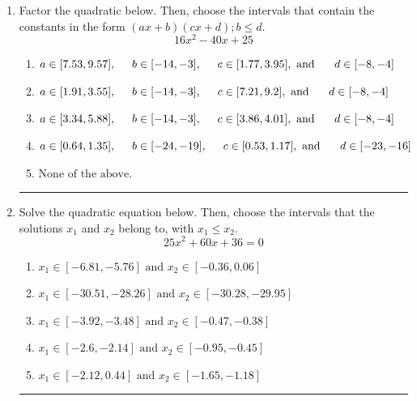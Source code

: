 \documentclass[14pt]{extbook}
\newcommand{\litem}[1]{\item#1\hspace*{-1cm}\rule{\textwidth}{0.4pt}}
\begin{document}
\begin{enumerate}
{\begin{enumerate}[label=\Alph*.]
\end{enumerate} }
\litem{
Factor the quadratic below. Then, choose the intervals that contain the constants in the form $(ax+b)(cx+d); b \leq d.$\[ 16x^{2} -40 x + 25 \]\begin{enumerate}[label=\Alph*.]
\item \( a \in [7.53, 9.57], \hspace*{5mm} b \in [-14, -3], \hspace*{5mm} c \in [1.77, 3.95], \text{ and } \hspace*{5mm} d \in [-8, -4] \)
\item \( a \in [1.91, 3.55], \hspace*{5mm} b \in [-14, -3], \hspace*{5mm} c \in [7.21, 9.2], \text{ and } \hspace*{5mm} d \in [-8, -4] \)
\item \( a \in [3.34, 5.88], \hspace*{5mm} b \in [-14, -3], \hspace*{5mm} c \in [3.86, 4.01], \text{ and } \hspace*{5mm} d \in [-8, -4] \)
\item \( a \in [0.64, 1.35], \hspace*{5mm} b \in [-24, -19], \hspace*{5mm} c \in [0.53, 1.17], \text{ and } \hspace*{5mm} d \in [-23, -16] \)
\item \( \text{None of the above.} \)

\end{enumerate} }
\litem{
Solve the quadratic equation below. Then, choose the intervals that the solutions $x_1$ and $x_2$ belong to, with $x_1 \leq x_2$.\[ 25x^{2} +60 x + 36 = 0 \]\begin{enumerate}[label=\Alph*.]
\item \( x_1 \in [-6.81, -5.76] \text{ and } x_2 \in [-0.36, 0.06] \)
\item \( x_1 \in [-30.51, -28.26] \text{ and } x_2 \in [-30.28, -29.95] \)
\item \( x_1 \in [-3.92, -3.48] \text{ and } x_2 \in [-0.47, -0.38] \)
\item \( x_1 \in [-2.6, -2.14] \text{ and } x_2 \in [-0.95, -0.45] \)
\item \( x_1 \in [-2.12, 0.44] \text{ and } x_2 \in [-1.65, -1.18] \)


\end{enumerate}}
\end{enumerate}
\end{document}
